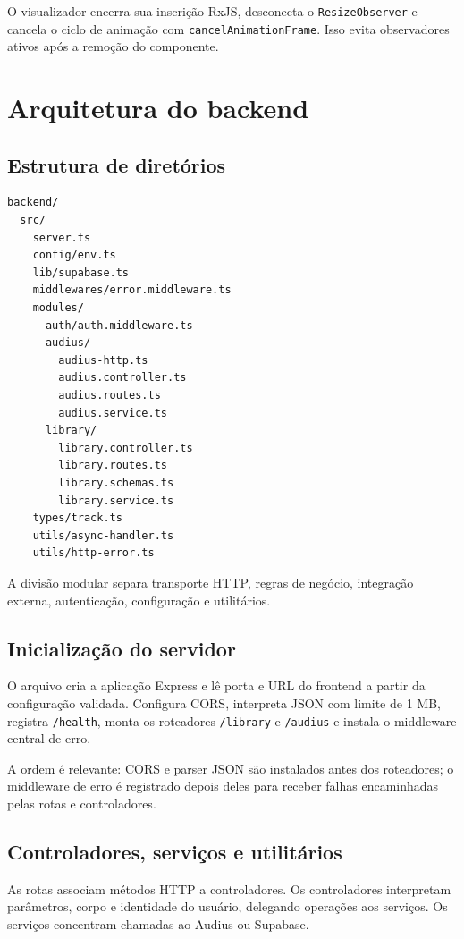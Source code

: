 \documentclass[12pt,a4paper,oneside]{report}
\newcommand{\arquivo}[1]{\texttt{\detokenize{#1}}}
\begin{document}
O visualizador encerra sua inscrição RxJS, desconecta o \texttt{ResizeObserver} e cancela o ciclo de animação com \texttt{cancelAnimationFrame}. Isso evita observadores ativos após a remoção do componente.

\chapter{Arquitetura do backend}
\section{Estrutura de diretórios}
\begin{lstlisting}
backend/
  src/
    server.ts
    config/env.ts
    lib/supabase.ts
    middlewares/error.middleware.ts
    modules/
      auth/auth.middleware.ts
      audius/
        audius-http.ts
        audius.controller.ts
        audius.routes.ts
        audius.service.ts
      library/
        library.controller.ts
        library.routes.ts
        library.schemas.ts
        library.service.ts
    types/track.ts
    utils/async-handler.ts
    utils/http-error.ts
\end{lstlisting}
A divisão modular separa transporte HTTP, regras de negócio, integração externa, autenticação, configuração e utilitários.

\section{Inicialização do servidor}
O arquivo \arquivo{backend/src/server.ts} cria a aplicação Express e lê porta e URL do frontend a partir da configuração validada. Configura CORS, interpreta JSON com limite de 1 MB, registra \texttt{/health}, monta os roteadores \texttt{/library} e \texttt{/audius} e instala o middleware central de erro.

A ordem é relevante: CORS e parser JSON são instalados antes dos roteadores; o middleware de erro é registrado depois deles para receber falhas encaminhadas pelas rotas e controladores.

\section{Controladores, serviços e utilitários}
As rotas associam métodos HTTP a controladores. Os controladores interpretam parâmetros, corpo e identidade do usuário, delegando operações aos serviços. Os serviços concentram chamadas ao Audius ou Supabase.
\end{document}
